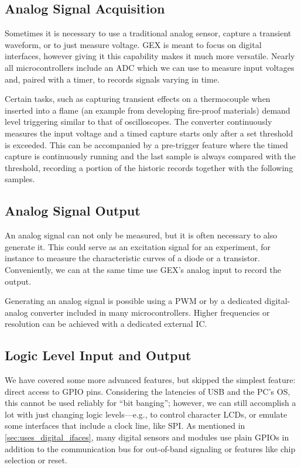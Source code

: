 \subsection{Analog Signal Acquisition}

Sometimes it is necessary to use a traditional analog sensor, capture a transient waveform, or to just measure voltage. GEX is meant to focus on digital interfaces, however giving it this capability makes it much more versatile. Nearly all microcontrollers include an \gls{ADC} which we can use to measure input voltages and, paired with a timer, to records signals varying in time.

Certain tasks, such as capturing transient effects on a thermocouple when inserted into a flame (an example from developing fire-proof materials) demand level triggering similar to that of oscilloscopes. The converter continuously measures the input voltage and a timed capture starts only after a set threshold is exceeded. This can be accompanied by a pre-trigger feature where the timed capture is continuously running and the last sample is always compared with the threshold, recording a portion of the historic records together with the following samples.

\subsection{Analog Signal Output}

An analog signal can not only be measured, but it is often necessary to also generate it. This could serve as an excitation signal for an experiment, for instance to measure the characteristic curves of a diode or a transistor. Conveniently, we can at the same time use GEX's analog input to record the output.

Generating an analog signal is possible using a \gls{PWM} or by a dedicated digital-analog converter included in many microcontrollers. Higher frequencies or resolution can be achieved with a dedicated external \gls{IC}.

\subsection{Logic Level Input and Output}

We have covered some more advanced features, but skipped the simplest feature: direct access to \gls{GPIO} pins. Considering the latencies of \gls{USB} and the \gls{PC}'s \gls{OS}, this cannot be used reliably for ``bit banging''; however, we can still accomplish a lot with just changing logic levels---e.g., to control character \glspl{LCD}, or emulate some interfaces that include a clock line, like \gls{SPI}. As mentioned in \cref{sec:uses_digital_ifaces}, many digital sensors and modules use plain \glspl{GPIO} in addition to the communication bus for out-of-band signaling or features like chip selection or reset.

